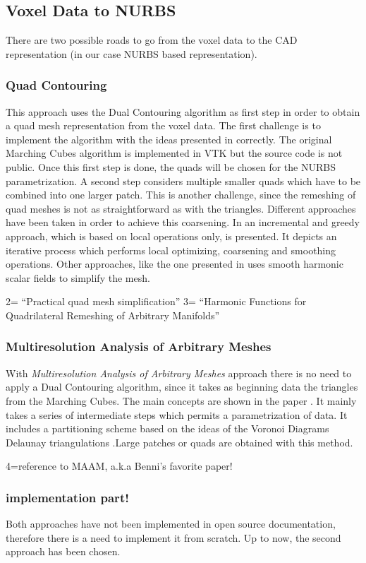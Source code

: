 
\subsection{Voxel Data to NURBS}
There are two possible roads to go from the voxel data to the CAD representation (in our case NURBS based representation).
\subsubsection{Quad Contouring}
This approach uses the Dual Contouring algorithm as first step in order to obtain a quad mesh representation from the voxel data. The first challenge is to implement the algorithm with the ideas presented in \cite{Hermite2002} correctly. The original Marching Cubes algorithm is implemented in VTK but the source code is not public. Once this first step is done, the quads will be chosen for the NURBS parametrization. A second step considers multiple smaller quads which have to be combined into one larger patch. This is another challenge, since the remeshing of quad meshes is not as straightforward as with the triangles. Different approaches have been taken in order to achieve this coarsening. In \cite{Puppo2010} an incremental and greedy approach, which is based on local operations only, is presented. It depicts an iterative process which performs local optimizing, coarsening and smoothing operations. Other approaches, like the one presented in \cite{Dong2005} uses smooth harmonic scalar fields to simplify the mesh.

2= “Practical quad mesh simplification”
3= “Harmonic Functions for Quadrilateral Remeshing of Arbitrary Manifolds”


\subsubsection{Multiresolution Analysis of Arbitrary Meshes}
With \textit{Multiresolution Analysis of Arbitrary Meshes} approach there is no need to apply a Dual Contouring algorithm, since it takes as beginning data the triangles from the Marching Cubes. The main concepts are shown in the paper \cite{eck1996automatic}. It mainly takes a series of intermediate steps which permits a parametrization of data. It includes a partitioning scheme based on the ideas of the Voronoi Diagrams  Delaunay triangulations .Large patches or quads are obtained with this method. 

4=reference to MAAM, a.k.a Benni's favorite paper!

\subsubsection{implementation part!}
Both approaches have not been implemented in open source documentation, therefore there is a need to implement it from scratch. Up to now, the second approach has been chosen.